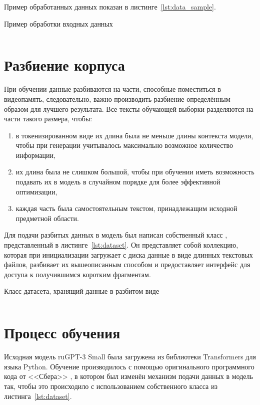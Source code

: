 Пример обработанных данных показан в листинге \ref*{lst:data_sample}.

\begin{listing}[H]
    \caption{Пример обработки входных данных}
    \inputminted[linenos=true]{text}{../inc/code/text_sample.txt}
    \label{lst:data_sample}
\end{listing}

\section{Разбиение корпуса}

При обучении данные разбиваются на части, способные поместиться в видеопамять, следовательно, важно производить разбиение определённым образом для лучшего результата. Все тексты обучающей выборки разделяются на части такого размера, чтобы:
\begin{enumerate}
    \item в токенизированном виде их длина была не меньше длины контекста модели, чтобы при генерации учитывалось максимально возможное количество информации,
    \item их длина была не слишком большой, чтобы при обучении иметь возможность подавать их в модель в случайном порядке для более эффективной оптимизации,
    \item каждая часть была самостоятельным текстом, принадлежащим исходной предметной области.
\end{enumerate}

Для подачи разбитых данных в модель был написан собственный класс , представленный в листинге \ref*{lst:dataset}. Он представляет собой коллекцию, которая при инициализации загружает с диска данные в виде длинных текстовых файлов, разбивает их вышеописанным способом и предоставляет интерфейс для доступа к получившимся коротким фрагментам.

\begin{listing}[H]
    \caption{Класс датасета, хранящий данные в разбитом виде}
    \inputminted{python}{../inc/code/texts_dataset.py}
    \label{lst:dataset}
\end{listing}

\section{Процесс обучения}

Исходная модель ruGPT-3 Small была загружена из библиотеки Transformers для языка Python. Обучение производилось с помощью оригинального программного кода от <<Сбера>> \cite{gh:sber}, в котором был изменён механизм подачи данных в модель так, чтобы это происходило с использованием собственного класса  из листинга \ref*{lst:dataset}.

